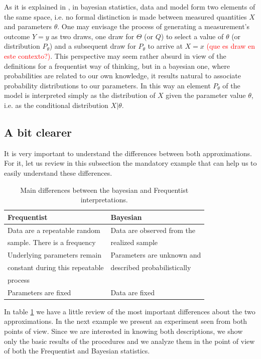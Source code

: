 \documentclass[onecolumn,           %
               showpacs,            %
               preprintnumbers,     %
               aps,                 %
               prl,          	    %
               letterpaper,             %
               superscriptaddress,      %
               nofootinbib,         %
               tightenlines,        %
               floats,floatfix      %
               ,usenatbib,
               ]{revtex4-1}
\begin{document}
As it is explained in \cite{bayeslecture}, in bayesian statistics, data and model form two elements of the same space, i.e. no formal distinction is made between measured quantities $X$ and parameters $\theta$. One may envisage the process of generating a measurement's outcome $Y=y$ as two draws, one draw for $\Theta$ (or $Q$) to select a value of $\theta$ (or distribution $P_\theta$) and a subsequent draw for $P_\theta$ to arrive at $X=x$ \textcolor{red}{(que es draw en este contexto?)}. This perspective may seem rather absurd in view of the definitions for a frequentist way of thinking, but in a bayesian one, where probabilities are related to our own knowledge, it results natural to associate probability distributions to our parameters. In this way an element $P_\theta$ of the model is interpreted simply as the distribution of $X$ given the parameter value $\theta$, i.e. as the conditional distribution $X|\theta$.
\subsection{A bit clearer}

It is very important to understand the differences between both approximations. For it, let us review in this subsection the mandatory example that can help us to easily understand these differences.
\begin{table}[h!]
\centering
\begin{tabular}{||l|l||} 
 \hline
 \textbf{Frequentist} & \textbf{Bayesian} \\ [0.5ex] 
 \hline\hline
 Data are a repeatable random  & Data are observed from the   \\ 
 sample. There is a frequency & realized sample \\
 \hline 
 Underlying parameters remain & Parameters are unknown and \\
 constant during this repeatable & described probabilistically \\
 process &  \\
\hline
Parameters are fixed & Data are fixed\\ [1ex] 
 \hline
\end{tabular}
\caption{\footnotesize{Main differences between the bayesian and Frequentist interpretations.}}
\label{table:1}
\end{table}

In table \ref{table:1} we have a little review of the most important differences about the two approximations. In the next example we present an experiment seen from both points of view. Since we are interested in knowing both descriptions, we show only the basic results of the procedures and we analyze them in the point of view of both the Frequentist and Bayesian statistics. 
\end{document}
